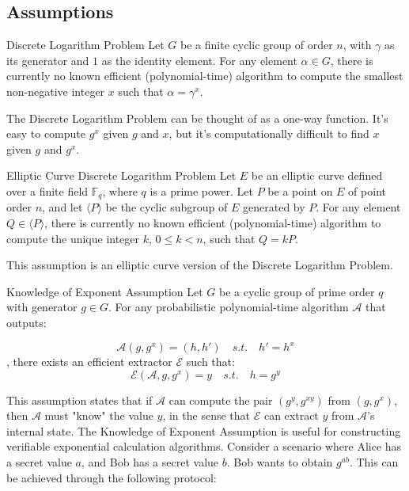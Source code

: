 \documentclass{article}
\begin{document}
\subsection{Assumptions}

\begin{assumption}{Discrete Logarithm Problem}{} Let $G$ be a finite cyclic group of order $n$, with $\gamma$ as its generator and $1$ as the identity element. For any element $\alpha \in G$, there is currently no known efficient (polynomial-time) algorithm to compute the smallest non-negative integer $x$ such that $\alpha = \gamma^{x}$.
\end{assumption}

The Discrete Logarithm Problem can be thought of as a one-way function. It's easy to compute $g^{x}$ given $g$ and $x$, but it's computationally difficult to find $x$ given $g$ and $g^{x}$.

\begin{assumption}{Elliptic Curve Discrete Logarithm Problem}{}
Let $E$ be an elliptic curve defined over a finite field $\mathbb{F}_q$, where $q$ is a prime power. Let $P$ be a point on $E$ of point order $n$, and let $\langle P \rangle$ be the cyclic subgroup of $E$ generated by $P$. For any element $Q \in \langle P \rangle$, there is currently no known efficient (polynomial-time) algorithm to compute the unique integer $k$, $0 \leq k < n$, such that $Q = kP$.
\end{assumption}

This assumption is an elliptic curve version of the Discrete Logarithm Problem.

\begin{assumption}{Knowledge of Exponent Assumption}{}
Let $G$ be a cyclic group of prime order $q$ with generator $g \in G$. For any probabilistic polynomial-time algorithm $\mathcal{A}$ that outputs:

\begin{equation}
\mathcal{A}(g, g^x) = (h, h') \quad s.t. \quad h' = h^x
\end{equation}
, there exists an efficient extractor $\mathcal{E}$ such that:
\begin{equation}
\mathcal{E}(\mathcal{A}, g, g^x) = y \quad s.t. \quad h = g^y
\end{equation}
\end{assumption}

This assumption states that if $\mathcal{A}$ can compute the pair $(g^y, g^{xy})$ from $(g, g^x)$, then $\mathcal{A}$ must "know" the value $y$, in the sense that $\mathcal{E}$ can extract $y$ from $\mathcal{A}$'s internal state.
The Knowledge of Exponent Assumption is useful for constructing verifiable exponential calculation algorithms. Consider a scenario where Alice has a secret value $a$, and Bob has a secret value $b$. Bob wants to obtain $g^{ab}$. This can be achieved through the following protocol:
\end{document}

